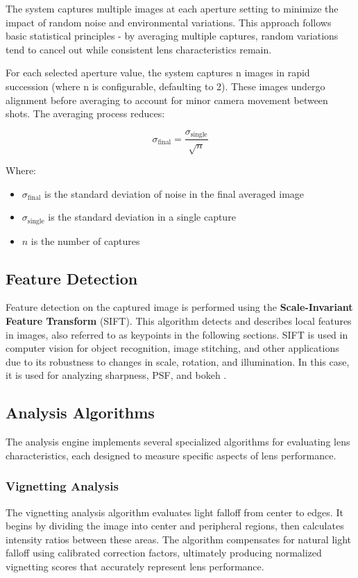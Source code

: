 The system captures multiple images at each aperture setting to minimize the impact of random noise and environmental variations. This approach follows basic statistical principles - by averaging multiple captures, random variations tend to cancel out while consistent lens characteristics remain.

For each selected aperture value, the system captures n images in rapid succession (where n is configurable, defaulting to 2). These images undergo alignment before averaging to account for minor camera movement between shots. The averaging process reduces:

\begin{equation}
\sigma_{\text{final}} = \frac{\sigma_{\text{single}}}{\sqrt{n}}
\end{equation}

Where:
\begin{itemize}
    \item \( \sigma_{\text{final}} \) is the standard deviation of noise in the final averaged image
    \item \( \sigma_{\text{single}} \) is the standard deviation in a single capture
    \item \( n \) is the number of captures
\end{itemize}


\subsection{Feature Detection}
Feature detection on the captured image is performed using the \textbf{Scale-Invariant Feature Transform} (SIFT). This algorithm detects and describes local features in images, also referred to as keypoints in the following sections. SIFT is used in computer vision for object recognition, image stitching, and other applications due to its robustness to changes in scale, rotation, and illumination. In this case, it is used for analyzing sharpness, PSF, and bokeh \cite{Sift}.

\subsection{Analysis Algorithms}
The analysis engine implements several specialized algorithms for evaluating lens characteristics, each designed to measure specific aspects of lens performance.

\subsubsection{Vignetting Analysis}
The vignetting analysis algorithm evaluates light falloff from center to edges. It begins by dividing the image into center and peripheral regions, then calculates intensity ratios between these areas. The algorithm compensates for natural light falloff using calibrated correction factors, ultimately producing normalized vignetting scores that accurately represent lens performance.

